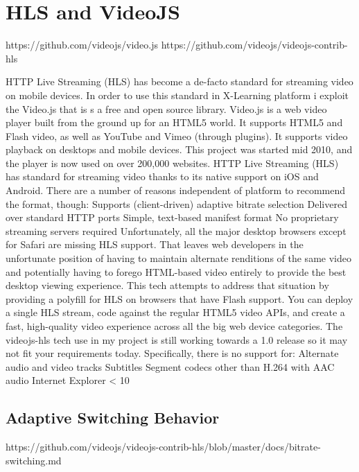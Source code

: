 \section{HLS and VideoJS}
\label{sec:HLS and VideoJS}

https://github.com/videojs/video.js
https://github.com/videojs/videojs-contrib-hls

HTTP Live Streaming (HLS) has become a de-facto standard for streaming video on mobile devices. In order to use this standard in X-Learning platform i exploit the Video.js that is s a free and open source library.
Video.js is a web video player built from the ground up for an HTML5 world. It supports HTML5 and Flash video, as well as YouTube and Vimeo (through plugins). It supports video playback on desktops and mobile devices. This project was started mid 2010, and the player is now used on over 200,000 websites.
HTTP Live Streaming (HLS) has standard for streaming video thanks to its native support on iOS and Android. There are a number of reasons independent of platform to recommend the format, though:
Supports (client-driven) adaptive bitrate selection
Delivered over standard HTTP ports
Simple, text-based manifest format
No proprietary streaming servers required
Unfortunately, all the major desktop browsers except for Safari are missing HLS support. That leaves web developers in the unfortunate position of having to maintain alternate renditions of the same video and potentially having to forego HTML-based video entirely to provide the best desktop viewing experience.
This tech attempts to address that situation by providing a polyfill for HLS on browsers that have Flash support. You can deploy a single HLS stream, code against the regular HTML5 video APIs, and create a fast, high-quality video experience across all the big web device categories.
The videojs-hls tech use in my project  is still working towards a 1.0 release so it may not fit your requirements today. Specifically, there is no support for:
Alternate audio and video tracks
Subtitles
Segment codecs other than H.264 with AAC audio
Internet Explorer < 10

\subsection{Adaptive Switching Behavior}
\label{sec:Adaptive Switching Behavior}

https://github.com/videojs/videojs-contrib-hls/blob/master/docs/bitrate-switching.md



